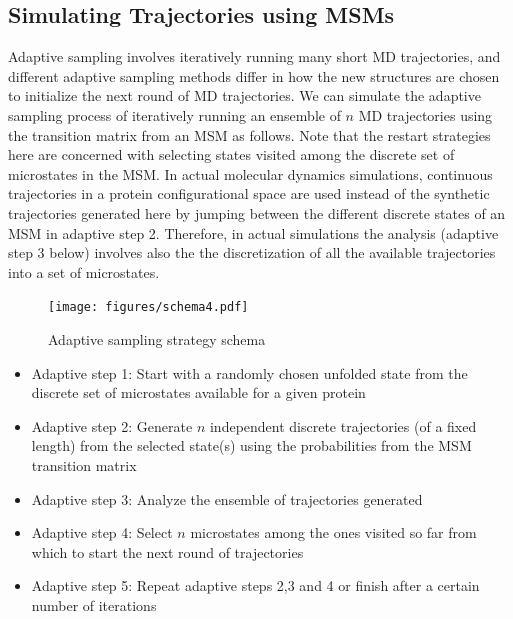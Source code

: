 \subsection{\label{sec:level5}Simulating Trajectories using MSMs}

Adaptive sampling involves iteratively running many short MD trajectories, and
different adaptive sampling methods differ in how the new structures are chosen
to initialize the next round of MD trajectories. We can simulate the adaptive
sampling process of iteratively running an ensemble of $n$ MD trajectories 
using the transition matrix from an MSM as follows. 
Note that the restart strategies here are concerned with selecting states
visited among the discrete set of microstates in the MSM. 
In actual molecular dynamics simulations, continuous trajectories in a protein
configurational space are used instead of the synthetic trajectories generated here
by jumping between the different discrete states of an MSM in adaptive step 2.
Therefore, in actual simulations the analysis (adaptive step 3 below) involves also the
the discretization of all the available trajectories into a set of microstates.

\begin{figure}[!ht]
  \centering
  \texttt{[image: figures/schema4.pdf]}
  \caption{Adaptive sampling strategy schema}
  \label{fig:schema}
\end{figure}

\begin{itemize}
\item Adaptive step 1: Start with a randomly chosen unfolded state from the discrete set of microstates available for a given protein
\item Adaptive step 2: Generate $n$ independent discrete trajectories (of a fixed length) from the selected state(s)
using the probabilities from the MSM transition matrix 
\item Adaptive step 3: Analyze the ensemble of trajectories generated
\item Adaptive step 4: Select $n$  microstates among the ones visited so far from which to start the next round of trajectories 
\item Adaptive step 5: Repeat adaptive steps 2,3 and 4 or finish after a certain number of iterations

\end{itemize}

